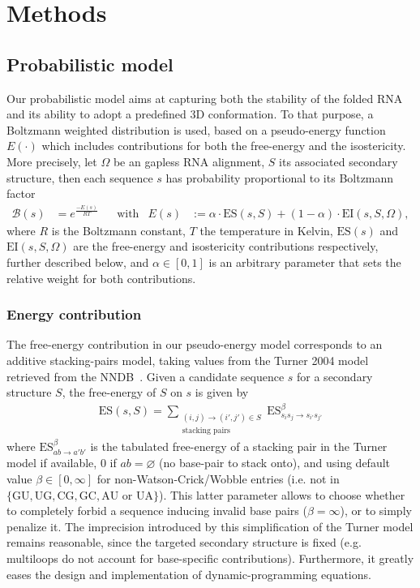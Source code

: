 \section{Methods}
\label{sec:methods}

\newcommand{\PE}[1]{E(#1)}
\newcommand{\EI}{\text{EI}}
\newcommand{\ES}{\text{ES}}
\newcommand{\ISO}{\text{ISO}}

\subsection{Probabilistic model}
Our probabilistic model aims at capturing both the stability of the folded RNA and its ability to adopt a predefined 3D conformation.
To that purpose, a Boltzmann weighted distribution is used, based on a pseudo-energy function $\PE{\cdot}$ which includes contributions for both 
the free-energy and the isostericity. 
More precisely, let $\Omega$ be an gapless RNA alignment, $S$ its associated secondary structure, 
then each sequence $s$ has probability proportional to its Boltzmann factor
\begin{align*}
  \mathcal{B}(s) &= e^\frac{-\PE{s}}{RT} &&\text{with}&\PE{s}&:=\alpha\cdot\ES(s,S)+(1-\alpha)\cdot\EI(s,S,\Omega),
\end{align*}
where $R$ is the Boltzmann constant, $T$ the temperature in Kelvin, $\ES(s)$ and $\EI(s,S,\Omega)$ 
are the free-energy and isostericity contributions respectively, further described below, and $\alpha\in[0,1]$ is an arbitrary parameter that sets the relative weight for both contributions.

\subsubsection{Energy contribution}
The free-energy contribution in our pseudo-energy model corresponds to an additive stacking-pairs model, taking values from the Turner 2004 model retrieved from the NNDB~\cite{Turner2010}. Given a candidate sequence $s$ for a secondary structure $S$, the free-energy of $S$ on $s$ is given by
\begin{align*}
  \ES(s,S) = \sum_{\substack{(i,j)\to (i',j')\in S\\ \text{stacking pairs}}}\ES^{\beta}_{s_is_j\to s_{i'}s_{j'}} 
\end{align*}
where $\ES^{\beta}_{ab\to a'b'}$ is the tabulated free-energy of a stacking pair in the Turner model if available, $0$ if $ab=\varnothing$ (no base-pair to stack onto), and using default value $\beta\in[0,\infty]$ for non-Watson-Crick/Wobble entries (i.e. not in $\{\text{GU},\text{UG},\text{CG},\text{GC}, \text{AU or UA}\}$). This latter parameter allows to choose whether to completely forbid a sequence inducing invalid base pairs ($\beta = \infty$), or to simply penalize it.
The imprecision introduced by this simplification of the Turner model remains reasonable, since the targeted secondary structure is fixed 
(e.g. multiloops do not account for base-specific contributions). Furthermore, it greatly eases the design and implementation of dynamic-programming equations. 

